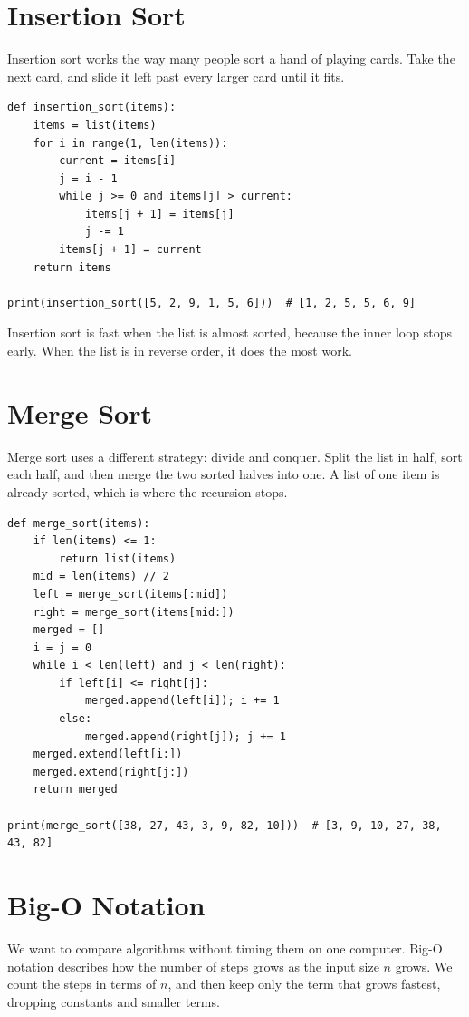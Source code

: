 \section{Insertion Sort}
Insertion sort works the way many people sort a hand of playing cards. Take
the next card, and slide it left past every larger card until it fits.

\begin{verbatim}
def insertion_sort(items):
    items = list(items)
    for i in range(1, len(items)):
        current = items[i]
        j = i - 1
        while j >= 0 and items[j] > current:
            items[j + 1] = items[j]
            j -= 1
        items[j + 1] = current
    return items

print(insertion_sort([5, 2, 9, 1, 5, 6]))  # [1, 2, 5, 5, 6, 9]
\end{verbatim}

Insertion sort is fast when the list is almost sorted, because the inner loop
stops early. When the list is in reverse order, it does the most work.

\section{Merge Sort}
Merge sort uses a different strategy: divide and conquer. Split the list in
half, sort each half, and then merge the two sorted halves into one. A list of
one item is already sorted, which is where the recursion stops.

\begin{verbatim}
def merge_sort(items):
    if len(items) <= 1:
        return list(items)
    mid = len(items) // 2
    left = merge_sort(items[:mid])
    right = merge_sort(items[mid:])
    merged = []
    i = j = 0
    while i < len(left) and j < len(right):
        if left[i] <= right[j]:
            merged.append(left[i]); i += 1
        else:
            merged.append(right[j]); j += 1
    merged.extend(left[i:])
    merged.extend(right[j:])
    return merged

print(merge_sort([38, 27, 43, 3, 9, 82, 10]))  # [3, 9, 10, 27, 38, 43, 82]
\end{verbatim}

\section{Big-O Notation}
We want to compare algorithms without timing them on one computer. Big-O
notation describes how the number of steps grows as the input size $n$ grows.
We count the steps in terms of $n$, and then keep only the term that grows
fastest, dropping constants and smaller terms.

